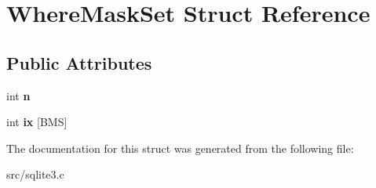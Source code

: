 \hypertarget{struct_where_mask_set}{\section{Where\-Mask\-Set Struct Reference}
\label{struct_where_mask_set}
}
\subsection*{Public Attributes}
\begin{DoxyCompactItemize}
\item 
\hypertarget{struct_where_mask_set_a09923e1dee2157c78c5ae0df65e8ee7c}{int {\bfseries n}}\label{struct_where_mask_set_a09923e1dee2157c78c5ae0df65e8ee7c}

\item 
\hypertarget{struct_where_mask_set_a9de4e7b27d4f793f37c1ead7b44ecb48}{int {\bfseries ix} \mbox{[}B\-M\-S\mbox{]}}\label{struct_where_mask_set_a9de4e7b27d4f793f37c1ead7b44ecb48}

\end{DoxyCompactItemize}


The documentation for this struct was generated from the following file\-:\begin{DoxyCompactItemize}
\item 
src/sqlite3.\-c\end{DoxyCompactItemize}
